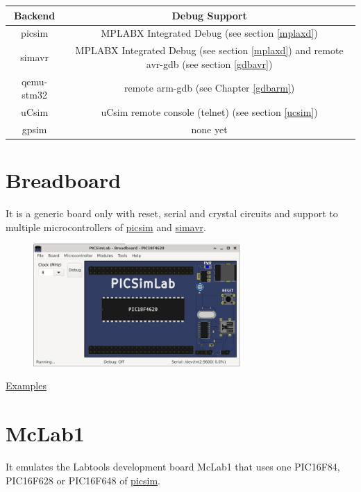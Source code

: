 \begin{center}
\begin{tabular}{c|c}
\hline \textbf{Backend} & \textbf{Debug Support}\\
\hline picsim & MPLABX Integrated Debug (see section \ref{mplaxd})\\
\hline simavr & MPLABX Integrated Debug (see section \ref{mplaxd}) and remote avr-gdb (see section \ref{gdbavr})\\
\hline qemu-stm32 & remote arm-gdb (see Chapter \ref{gdbarm})\\
\hline uCsim & uCsim remote console (telnet) (see section \ref{ucsim})\\
\hline gpsim & none yet\\
\hline 
\end{tabular}
\end{center}



\section{Breadboard}

It is a generic board only with reset, serial and crystal circuits and support to multiple microcontrollers 
of \href{https://github.com/lcgamboa/picsim}{picsim} and \href{https://github.com/buserror/simavr}{simavr}.

\begin{figure}[H]
\center
\includegraphics[width=0.7\textwidth]{img/picsimlab0.png} 
\end{figure} 

\href{https://lcgamboa.github.io/picsimlab_examples/examples/examples_index.html\#board_Breadboard}{Examples}

\section{McLab1}

It emulates the Labtools development board McLab1 that uses one PIC16F84, PIC16F628 or PIC16F648 of \href{https://github.com/lcgamboa/picsim}{picsim}.

